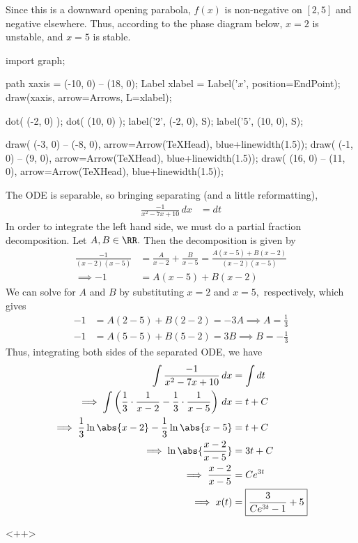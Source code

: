 \documentclass{article}
\begin{document}
\begin{enumerate}
\begin{soln}
			Since this is a downward opening parabola, $f(x)$ is non-negative on $[2, 5]$ and negative elsewhere. Thus, according to the phase diagram below, $x=2$ is unstable, and $x=5$ is stable.
			\begin{center}
				\begin{asy}
					import graph;

					path xaxis = (-10, 0) -- (18, 0);
					Label xlabel = Label('$x$', position=EndPoint);
					draw(xaxis, arrow=Arrows, L=xlabel);

					dot( (-2, 0) );
					dot( (10, 0) );
					label('2', (-2, 0), S);
					label('5', (10, 0), S);

					draw( (-3, 0) -- (-8, 0), arrow=Arrow(TeXHead), blue+linewidth(1.5));
					draw( (-1, 0) -- (9, 0), arrow=Arrow(TeXHead), blue+linewidth(1.5));
					draw( (16, 0) -- (11, 0), arrow=Arrow(TeXHead), blue+linewidth(1.5));
				\end{asy}
			\end{center}
			The ODE is separable, so bringing separating (and a little reformatting), 
			\begin{align*}
				\frac{-1}{x^2-7x+10} \, dx &= dt 
			\end{align*}
			In order to integrate the left hand side, we must do a partial fraction decomposition. Let $A, B\in \RR.$ Then the decomposition is given by
			\begin{align*}
				\frac{-1}{(x-2)(x-5)} &= \frac{A}{x-2} + \frac{B}{x-5} = \frac{A(x-5) + B(x-2)}{(x-2)(x-5)} \\
				\implies -1 &= A(x-5) + B(x-2)
			\end{align*}
			We can solve for $A$ and $B$ by substituting $x=2$ and $x=5,$ respectively, which gives
			\begin{align*}
				-1 &= A(2-5) + B(2-2) = -3A \implies A = \frac{1}{3} \\
				-1 &= A(5-5) + B(5-2) = 3B \implies B = -\frac{1}{3}
			\end{align*}
			Thus, integrating both sides of the separated ODE, we have
			\begin{align*}
				\int \frac{-1}{x^2-7x+10}\, dx &= \int dt \\
				\implies\int\left( \frac{1}{3}\cdot \frac{1}{x-2} - \frac{1}{3}\cdot\frac{1}{x-5} \right)\, dx &= t+C \\
				\implies \frac{1}{3}\ln\abs{x-2} - \frac{1}{3}\ln\abs{x-5} &= t+C \\
				\implies \ln \abs{\frac{x-2}{x-5}} &= 3t+C \\
				\implies \frac{x-2}{x-5} &= Ce^{3t} \\
				\implies x(t) &= \boxed{\frac{3}{Ce^{3t}-1} + 5}
			\end{align*}
		\end{soln}<++>


\end{enumerate}
\end{document}
